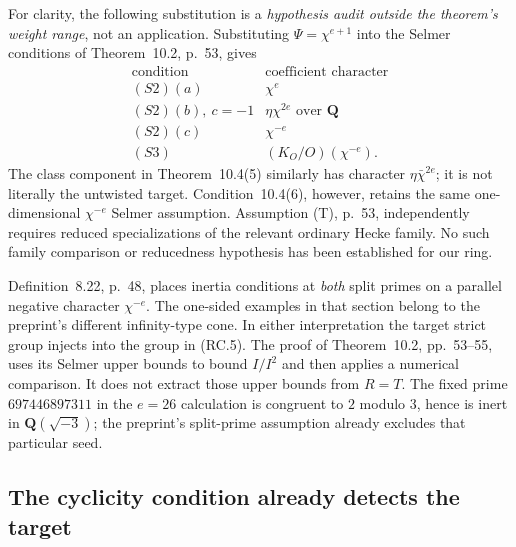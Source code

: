 \documentclass[11pt,a4paper]{article}
\theoremstyle{definition}
\begin{document}
For clarity, the following substitution is a
\emph{hypothesis audit outside the theorem's weight
range}, not an application.  Substituting
$\Psi=\chi^{e+1}$ into the Selmer conditions of
Theorem~10.2, p.~53, gives
\[
 \begin{array}{c|c}
 \text{condition}&\text{coefficient character}\\ \hline
 (S2)(a)&\chi^e\\
 (S2)(b),\ c=-1&\eta\chi^{2e}\text{ over }\mathbf Q\\
 (S2)(c)&\chi^{-e}\\
 (S3)&(K_O/O)(\chi^{-e}).
 \end{array}                                                \tag{RC.5}
\]
The class component in Theorem~10.4(5) similarly has
character $\eta\bar\chi^{2e}$; it is not literally the
untwisted target.  Condition~10.4(6), however, retains
the same one-dimensional $\chi^{-e}$ Selmer assumption.
Assumption (T), p.~53, independently requires reduced
specializations of the relevant ordinary Hecke family.
No such family comparison or reducedness hypothesis has
been established for our ring.

Definition~8.22, p.~48, places inertia conditions at
\emph{both} split primes on a parallel negative character
$\chi^{-e}$.  The one-sided examples in that section
belong to the preprint's different infinity-type cone.
In either interpretation the target strict group injects
into the group in (RC.5).  The proof of Theorem~10.2,
pp.~53--55, uses its Selmer upper bounds to bound
$I/I^2$ and then applies a numerical comparison.
It does not extract those upper bounds from $R=T$.
The fixed prime $697446897311$ in the $e=26$ calculation
is congruent to $2$ modulo $3$, hence is inert in
$\mathbf Q(\sqrt{-3})$; the preprint's split-prime
assumption already excludes that particular seed.

\subsection{The cyclicity condition already detects the target}
\end{document}
